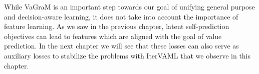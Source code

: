 While VaGraM is an important step towards our goal of unifying general purpose and decision-aware learning, it does not take into account the importance of feature learning.
As we saw in the previous chapter, latent self-prediction objectives can lead to features which are aligned with the goal of value prediction.
In the next chapter we will see that these losses can also serve as auxiliary losses to stabilize the problems with IterVAML that we observe in this chapter.